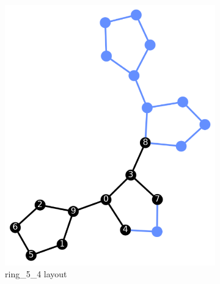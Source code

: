 \begin{figure}[!htb]
\begin{subfigure}{0.3\linewidth}
        \includegraphics[width=\linewidth]{image/dj_10_ring_5_4.png}
        \caption{ring\_5\_4 layout}
        \label{fig:dj_10_ring_5_4}
    \end{subfigure}
    \hfill
    \begin{subfigure}{0.25\linewidth}

\end{subfigure}
\end{figure}
